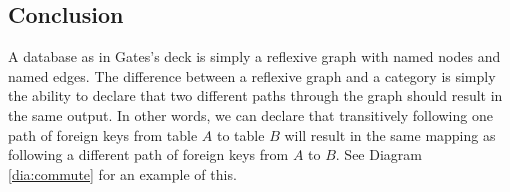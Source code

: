 \documentclass{amsart}
\theoremstyle{remark}
\theoremstyle{definition}
\begin{document}
\subsection{Conclusion}

A database as in Gates's deck is simply a reflexive graph with named nodes and named edges.  The difference between a reflexive graph and a category is simply the ability to declare that two different paths through the graph should result in the same output.  In other words, we can declare that transitively following one path of foreign keys from table $A$ to table $B$ will result in the same mapping as following a different path of foreign keys from $A$ to $B$.  See Diagram \ref{dia:commute} for an example of this.
\end{document}
